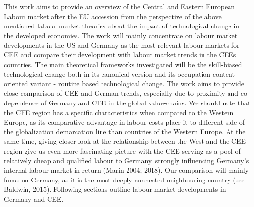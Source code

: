 \documentclass{article}
\begin{document}
This work aims to provide an overview of the Central and Eastern European Labour market after the EU accession from the perspective of the above mentioned labour market theories about the impact of technological change in the developed economies. The work will mainly concentrate on labour market developments in the US and Germany as the most relevant labour markets for CEE and compare their development with labour market trends in the CEEs countries. The main theoretical frameworks investigated will be the skill-biased technological change both in its canonical version and its occupation-content oriented variant - routine based technological change. The work aims to provide close comparison of CEE and German trends, especially due to proximity and co-dependence of Germany and CEE in the global value-chains.
We should note that the CEE region has a specific characteristics when compared to the Western Europe, as its comparative advantage in labour costs place it to different side of the globalization demarcation line than countries of the Western Europe. At the same time, giving closer look at the relationship between the West and the CEE region give us even more fascinating picture with the CEE serving as a pool of relatively cheap and qualified labour to Germany, strongly influencing Germany's internal labour market in return (Marin 2004; 2018). Our comparison will mainly focus on Germany, as it is the most deeply connected neighbouring country (see Baldwin, 2015). Following sections outline labour market developments in Germany and CEE.
\end{document}
